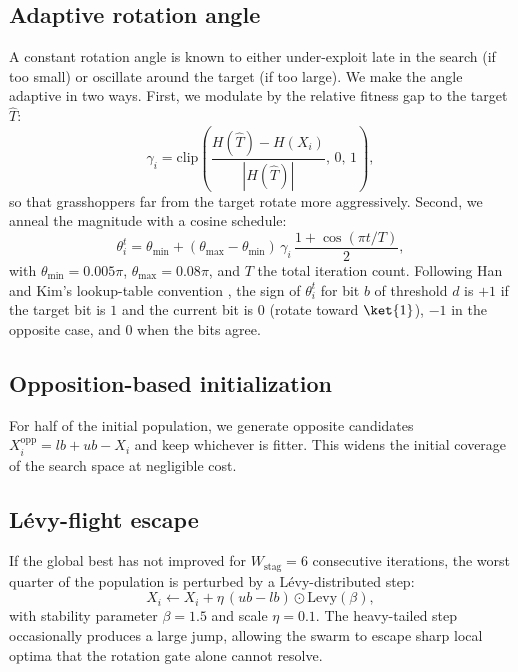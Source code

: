 \subsection{Adaptive rotation angle}

A constant rotation angle is known to either under-exploit late in the search (if too small) or oscillate around the target (if too large). We make the angle adaptive in two ways. First, we modulate by the relative fitness gap to the target $\hat{T}$:
\begin{equation}\label{eq:theta-gap}
\gamma_i = \mathrm{clip}\!\left(\frac{H(\hat{T}) - H(X_i)}{|H(\hat{T})|},\,0,\,1\right),
\end{equation}
so that grasshoppers far from the target rotate more aggressively. Second, we anneal the magnitude with a cosine schedule:
\begin{equation}\label{eq:theta}
\theta_i^{t} = \theta_{\min} + (\theta_{\max} - \theta_{\min})\,\gamma_i\,\frac{1+\cos(\pi t/T)}{2},
\end{equation}
with $\theta_{\min}{=}0.005\pi$, $\theta_{\max}{=}0.08\pi$, and $T$ the total iteration count. Following Han and Kim's lookup-table convention \cite{han2002qiea}, the sign of $\theta_i^t$ for bit $b$ of threshold $d$ is $+1$ if the target bit is $1$ and the current bit is $0$ (rotate toward $\ket{1}$), $-1$ in the opposite case, and $0$ when the bits agree.

\subsection{Opposition-based initialization}

For half of the initial population, we generate opposite candidates $X_i^{\text{opp}}{=}lb{+}ub{-}X_i$ \cite{tizhoosh2005obl} and keep whichever is fitter. This widens the initial coverage of the search space at negligible cost.

\subsection{L\'evy-flight escape}

If the global best has not improved for $W_\text{stag}{=}6$ consecutive iterations, the worst quarter of the population is perturbed by a L\'evy-distributed step:
\begin{equation}\label{eq:levy}
X_i \leftarrow X_i + \eta\,(ub-lb)\odot \mathrm{Levy}(\beta),
\end{equation}
with stability parameter $\beta{=}1.5$ and scale $\eta{=}0.1$. The heavy-tailed step occasionally produces a large jump, allowing the swarm to escape sharp local optima that the rotation gate alone cannot resolve.

